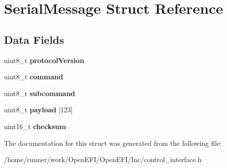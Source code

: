 \hypertarget{structSerialMessage}{}\section{Serial\+Message Struct Reference}
\label{structSerialMessage}
\subsection*{Data Fields}
\begin{DoxyCompactItemize}
\item 
\mbox{\label{structSerialMessage_aa41cdf6c9d8001119b5be27070271b98}} 
uint8\+\_\+t {\bfseries protocol\+Version}
\item 
\mbox{\label{structSerialMessage_a71592aeef849dda1b4e5fddbb739607b}} 
uint8\+\_\+t {\bfseries command}
\item 
\mbox{\label{structSerialMessage_a5417ab8ac06f6d763b4c3edf398e8319}} 
uint8\+\_\+t {\bfseries subcommand}
\item 
\mbox{\label{structSerialMessage_a574cdeda4670e72b218b59138eda65f9}} 
uint8\+\_\+t {\bfseries payload} \mbox{[}123\mbox{]}
\item 
\mbox{\label{structSerialMessage_aaa01e1797fe94805deb1cc04dc2a7c6a}} 
uint16\+\_\+t {\bfseries checksum}
\end{DoxyCompactItemize}


The documentation for this struct was generated from the following file\+:\begin{DoxyCompactItemize}
\item 
/home/runner/work/\+Open\+E\+F\+I/\+Open\+E\+F\+I/\+Inc/control\+\_\+interface.\+h\end{DoxyCompactItemize}

